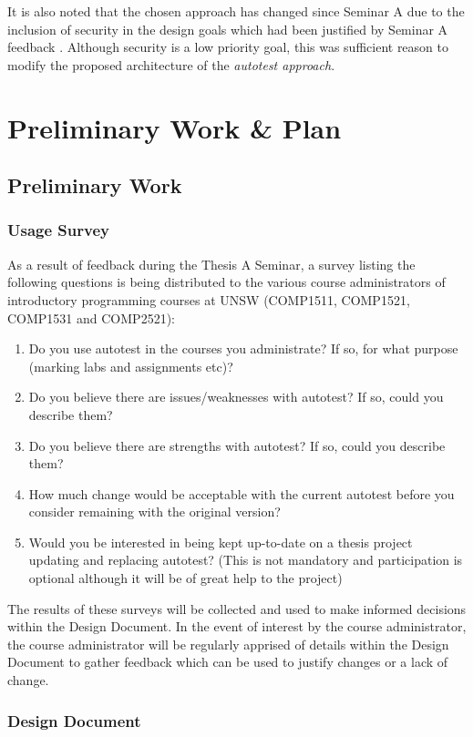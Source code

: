 \documentclass[hidelinks, 12pt]{extreport}
\newcommand{\unchapter}[2]{
    \setcounter{chapter}{#1}
    \setcounter{section}{0}
    \chapter*{#2}
    \addcontentsline{toc}{chapter}{#2}
}
\begin{document}
It is also noted that the chosen approach has changed since Seminar A due to the inclusion of security in the design goals which had been justified by Seminar A feedback \cite{AutotestConversation}. Although security is a low priority goal, this was sufficient reason to modify the proposed architecture of the \textit{autotest approach}.

\unchapter{5}{Preliminary Work \& Plan}

\section{Preliminary Work}

\subsection{Usage Survey}

As a result of feedback during the Thesis A Seminar, a survey listing the following questions is being distributed to the various course administrators of introductory programming courses at UNSW (COMP1511, COMP1521, COMP1531 and COMP2521):
\begin{enumerate}
	\item Do you use autotest in the courses you administrate? If so, for what purpose (marking labs and assignments etc)?
	\item Do you believe there are issues/weaknesses with autotest? If so, could you describe them?
	\item Do you believe there are strengths with autotest? If so, could you describe them?
	\item How much change would be acceptable with the current autotest before you consider remaining with the original version?
	\item Would you be interested in being kept up-to-date on a thesis project updating and replacing autotest? (This is not mandatory and participation is optional although it will be of great help to the project)
\end{enumerate}

The results of these surveys will be collected and used to make informed decisions within the Design Document. In the event of interest by the course administrator, the course administrator will be regularly apprised of details within the Design Document to gather feedback which can be used to justify changes or a lack of change.

\subsection{Design Document}
\end{document}
